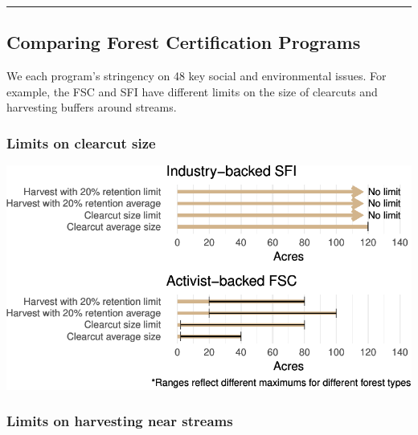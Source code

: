 \documentclass[
      12pt,
        ]{article}
\begin{document}
\begin{center}\rule{0.5\linewidth}{\linethickness}\end{center}

\subsection{Comparing Forest Certification
Programs}\label{comparing-forest-certification-programs}

We each program's stringency on 48 key social and environmental issues.
For example, the FSC and SFI have different limits on the size of
clearcuts and harvesting buffers around streams.

\subsubsection{Limits on clearcut size}\label{limits-on-clearcut-size}

\begin{center}\includegraphics{Figs/clearcuts-1} \end{center}

\subsubsection{Limits on harvesting near
streams}\label{limits-on-harvesting-near-streams}
\end{document}
